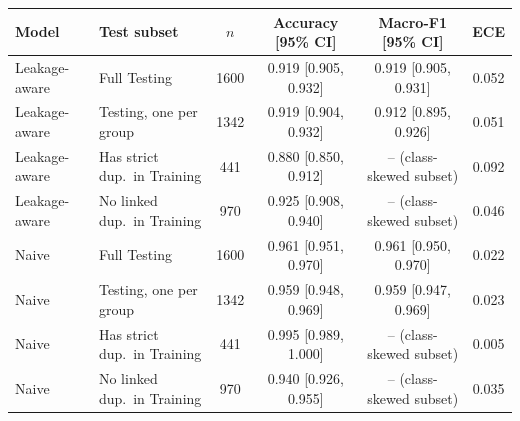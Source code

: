 \begin{tabular}{llcccc}
\toprule
Model & Test subset & $n$ & Accuracy [95\% CI] & Macro-F1 [95\% CI] & ECE \\
\midrule
Leakage-aware & Full Testing & 1600 & 0.919 [0.905, 0.932] & 0.919 [0.905, 0.931] & 0.052 \\
Leakage-aware & Testing, one per group & 1342 & 0.919 [0.904, 0.932] & 0.912 [0.895, 0.926] & 0.051 \\
Leakage-aware & Has strict dup.\ in Training & 441 & 0.880 [0.850, 0.912] & -- (class-skewed subset) & 0.092 \\
Leakage-aware & No linked dup.\ in Training & 970 & 0.925 [0.908, 0.940] & -- (class-skewed subset) & 0.046 \\
\midrule
Naive & Full Testing & 1600 & 0.961 [0.951, 0.970] & 0.961 [0.950, 0.970] & 0.022 \\
Naive & Testing, one per group & 1342 & 0.959 [0.948, 0.969] & 0.959 [0.947, 0.969] & 0.023 \\
Naive & Has strict dup.\ in Training & 441 & 0.995 [0.989, 1.000] & -- (class-skewed subset) & 0.005 \\
Naive & No linked dup.\ in Training & 970 & 0.940 [0.926, 0.955] & -- (class-skewed subset) & 0.035 \\
\bottomrule
\end{tabular}